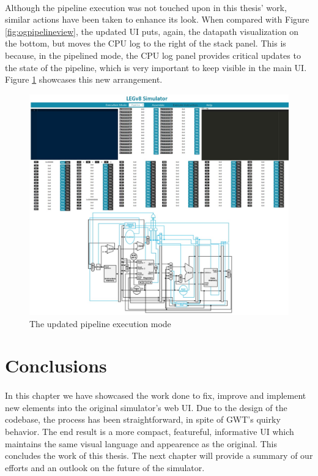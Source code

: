 \paragraph{}
Although the pipeline execution was not touched upon in this thesis' work, similar actions have been taken to enhance its look. When compared with Figure \ref{fig:ogpipelineview}, the updated UI puts, again,  the datapath visualization on the bottom, but moves the CPU log to the right of the stack panel. This is because, in the pipelined mode, the CPU log panel provides critical updates to the state of the pipeline, which is very important to keep visible in the main UI. Figure \ref{fig:newpipelinevis} showcases this new arrangement.
\begin{figure}
    \centering
    \includegraphics[width=1\linewidth]{img/new_pipeline.jpeg}
    \caption{The updated pipeline execution mode}
    \label{fig:newpipelinevis}
\end{figure}
\section{Conclusions}
\paragraph{}
In this chapter we have showcased the work done to fix, improve and implement new elements into the original simulator's web UI. Due to the design of the codebase, the process has been straightforward, in spite of GWT's quirky behavior. The end result is a more compact, featureful, informative UI which maintains the same visual language and appearence as the original. This concludes the work of this thesis. The next chapter will provide a summary of our efforts and an outlook on the future of the simulator.